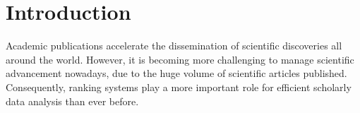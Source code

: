 \section{Introduction}
\label{sec-intro}



Academic publications accelerate the dissemination of scientific discoveries all around the world. However, it is becoming more challenging to manage scientific advancement nowadays, due to the huge volume of scientific articles published.
Consequently, ranking systems play a more important role for efficient scholarly data analysis than ever before.







